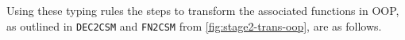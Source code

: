 \documentclass[ oneside,%
                    author={James Elgar},
                    degree={MEng},
                     title={Bidirectional transformer between functional and \\ object-oriented programming in Rust},
                  subtitle={}]{dissertation}
\begin{document}




Using these typing rules the steps to transform the associated functions in OOP, as outlined in \verb|DEC2CSM| and \verb|FN2CSM| from \autoref{fig:stage2-trans-oop}, are as follows.
\end{document}

